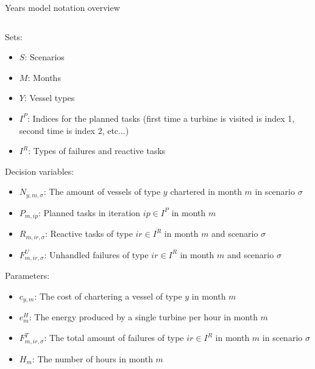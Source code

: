 \documentclass{beamer}
\newcommand{\smalld}{\tiny}
\begin{document}
\begin{frame}{Years model notation overview}
\smalld
\begin{columns}
\begin{column}{.48\textwidth}
Sets:
\begin{itemize}
\item $S$: Scenarios
\item $M$: Months
\item $Y$: Vessel types
\item $I^P$: Indices for the planned tasks (first time a turbine is visited is index 1, second time is index 2, etc...)
\item $I^R$: Types of failures and reactive tasks
\end{itemize}

Decision variables:
\begin{itemize}
\item $N_{y,m,\sigma}$: The amount of vessels of type $y$ chartered in month $m$ in scenario $\sigma$
\item $P_{m,ip}$: Planned tasks in iteration $ip \in I^P$ in month $m$
\item $R_{m,ir,\sigma}$: Reactive tasks of type $ir \in I^R$ in month $m$ and scenario $\sigma$
\item $F^U_{m,ir,\sigma}$: Unhandled failures of type $ir \in I^R$ in month $m$ and scenario $\sigma$
\end{itemize}

Parameters:
\begin{itemize}
\item $c_{y,m}$: The cost of chartering a vessel of type $y$ in month $m$
\item $e^H_m$: The energy produced by a single turbine per hour in month $m$
\item $F^T_{m,ir,\sigma}$: The total amount of failures of type $ir \in I^R$ in month $m$ in scenario $\sigma$
\item $H_m$: The number of hours in month $m$
\end{itemize}
\end{column}

\hfill


\end{columns}
\end{frame}
\end{document}
